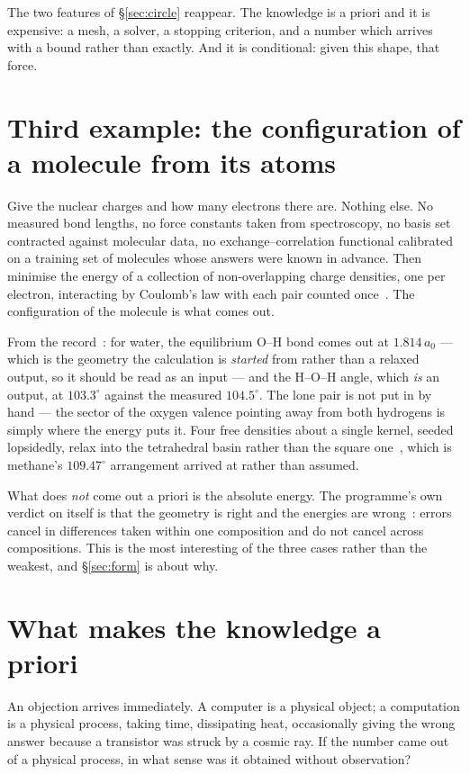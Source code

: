 \documentclass[11pt]{article}
\begin{document}
The two features of \S\ref{sec:circle} reappear. The knowledge is a priori and it is expensive: a
mesh, a solver, a stopping criterion, and a number which arrives with a bound rather than exactly.
And it is conditional: given this shape, that force.

\section{Third example: the configuration of a molecule from its atoms}\label{sec:realqm}

Give the nuclear charges and how many electrons there are. Nothing else. No measured bond lengths,
no force constants taken from spectroscopy, no basis set contracted against molecular data, no
exchange--correlation functional calibrated on a training set of molecules whose answers were known
in advance. Then minimise the energy of a collection of non-overlapping charge densities, one per
electron, interacting by Coulomb's law with each pair counted once~\cite{realqm,realqmbook}. The configuration of the
molecule is what comes out.

From the record~\cite{universality}: for water, the equilibrium O--H bond comes out at
$1.814\,a_0$ --- which is the geometry the calculation is \emph{started} from rather than a relaxed output, so it should be read as an input --- and the H--O--H angle, which \emph{is} an output, at $103.3^\circ$ against the measured $104.5^\circ$. The lone pair is
not put in by hand --- the sector of the oxygen valence pointing away from both hydrogens is simply
where the energy puts it. Four free densities about a single kernel, seeded lopsidedly, relax into
the tetrahedral basin rather than the square one~\cite{chirality}, which is methane's
$109.47^\circ$ arrangement arrived at rather than assumed.

What does \emph{not} come out a priori is the absolute energy. The programme's own verdict on itself
is that the geometry is right and the energies are wrong~\cite{atoms}: errors cancel in differences taken within
one composition and do not cancel across compositions. This is the most interesting of the three
cases rather than the weakest, and \S\ref{sec:form} is about why.

\section{What makes the knowledge a priori}\label{sec:criterion}

An objection arrives immediately. A computer is a physical object; a computation is a physical
process, taking time, dissipating heat, occasionally giving the wrong answer because a transistor
was struck by a cosmic ray. If the number came out of a physical process, in what sense was it
obtained without observation?
\end{document}
